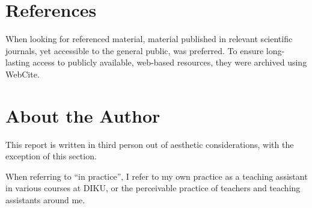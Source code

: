 \section{References}

When looking for referenced material, material published in relevant scientific
journals, yet accessible to the general public, was preferred. To ensure
long-lasting access to publicly available, web-based resources, they were
archived using WebCite\textsuperscript{\textregistered}.

\section{About the Author}

This report is written in third person out of aesthetic considerations, with
the exception of this section.

When referring to ``in practice'', I refer to my own practice as a teaching
assistant in various courses at DIKU, or the perceivable practice of teachers
and teaching assistants around me.

